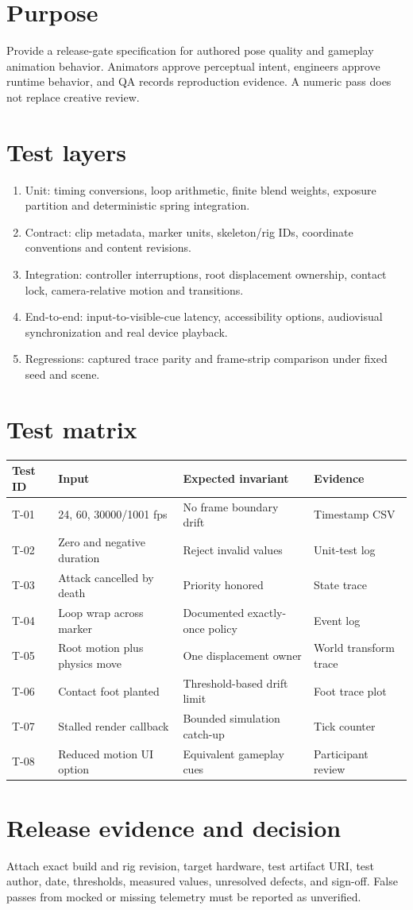 \documentclass[10pt,letterpaper]{article}
\begin{document}
\makedoctitle
\makedocsummary
\tableofcontents\clearpage

\section{Purpose}
Provide a release-gate specification for authored pose quality and gameplay animation behavior. Animators approve perceptual intent, engineers approve runtime behavior, and QA records reproduction evidence. A numeric pass does not replace creative review.
\section{Test layers}
\begin{enumerate}
\item Unit: timing conversions, loop arithmetic, finite blend weights, exposure partition and deterministic spring integration.
\item Contract: clip metadata, marker units, skeleton/rig IDs, coordinate conventions and content revisions.
\item Integration: controller interruptions, root displacement ownership, contact lock, camera-relative motion and transitions.
\item End-to-end: input-to-visible-cue latency, accessibility options, audiovisual synchronization and real device playback.
\item Regressions: captured trace parity and frame-strip comparison under fixed seed and scene.
\end{enumerate}
\section{Test matrix}
\begin{longtable}{p{.18\linewidth}p{.24\linewidth}p{.26\linewidth}p{.2\linewidth}}
\textbf{Test ID}&\textbf{Input}&\textbf{Expected invariant}&\textbf{Evidence}\\\hline
T-01&24, 60, 30000/1001 fps&No frame boundary drift&Timestamp CSV\\
T-02&Zero and negative duration&Reject invalid values&Unit-test log\\
T-03&Attack cancelled by death&Priority honored&State trace\\
T-04&Loop wrap across marker&Documented exactly-once policy&Event log\\
T-05&Root motion plus physics move&One displacement owner&World transform trace\\
T-06&Contact foot planted&Threshold-based drift limit&Foot trace plot\\
T-07&Stalled render callback&Bounded simulation catch-up&Tick counter\\
T-08&Reduced motion UI option&Equivalent gameplay cues&Participant review\\
\end{longtable}
\section{Release evidence and decision}
Attach exact build and rig revision, target hardware, test artifact URI, test author, date, thresholds, measured values, unresolved defects, and sign-off. False passes from mocked or missing telemetry must be reported as unverified.
\end{document}
